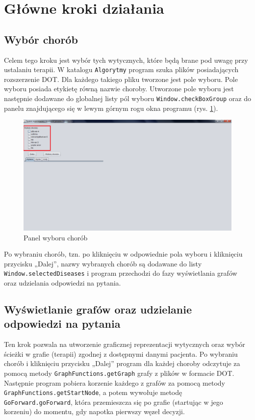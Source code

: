 \section{Główne kroki działania}
\label{sec:kroki}

\subsection{Wybór chorób}
Celem tego kroku jest wybór tych wytycznych, które będą brane pod uwagę przy ustalaniu terapii. W katalogu \texttt{Algorytmy} program szuka plików posiadających rozszerzenie DOT. Dla każdego takiego pliku tworzone jest pole wyboru. Pole wyboru posiada etykietę równą nazwie choroby. Utworzone pole wyboru jest następnie dodawane do globalnej listy 
pól wyboru \texttt{Window.checkBoxGroup} oraz do panelu 
znajdującego się w lewym górnym rogu okna programu (rys. \ref{fig:wybor_chorob}). 
\begin{figure}[H]
\centering
\includegraphics[width=\textwidth]{img/wybor_chorob.png}
\caption{Panel wyboru chorób}
\label{fig:wybor_chorob}
\end{figure}
Po wybraniu chorób, tzn. po kliknięciu w odpowiednie pola wyboru i kliknięciu przycisku „Dalej”, nazwy wybranych chorób są dodawane do listy \texttt{Window.selectedDiseases} i program przechodzi do fazy wyświetlania grafów oraz udzielania odpowiedzi na pytania. 

\subsection{Wyświetlanie grafów oraz udzielanie odpowiedzi na pytania}
Ten krok pozwala na utworzenie graficznej reprezentacji wytycznych oraz wybór ścieżki w grafie (terapii) zgodnej z dostępnymi danymi pacjenta. Po wybraniu chorób i kliknięciu przycisku „Dalej” program dla każdej choroby odczytuje za pomocą metody \texttt{GraphFunctions.getGraph} grafy z plików w formacie DOT. Następnie program pobiera korzenie każdego z grafów za pomocą metody \texttt{GraphFunctions.get\-StartNode}, a potem wywołuje metodę \texttt{GoForward.goForward}, która przemieszcza się po grafie (startując w jego korzeniu) do momentu, gdy napotka pierwszy węzeł decyzji. 

